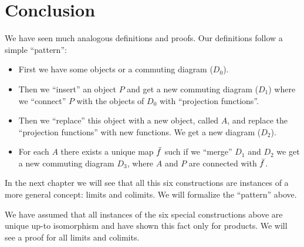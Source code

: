 \section*{Conclusion}
We have seen much analogous definitions and proofs.
Our definitions follow a simple ``pattern'':
\begin{itemize}
  \item First we have some objects or a commuting diagram ($D_0$).
  \item Then we ``insert'' an object $P$ and get a new commuting diagram ($D_1$) where we ``connect'' $P$ with the objects of $D_0$ with ``projection functions''.
  \item Then we ``replace'' this object with a new object, called $A$, and replace the ``projection functions'' with new functions. We get a new diagram ($D_2$).
  \item For each $A$ there exists a unique map $\bar{f}$ such if we ``merge'' $D_1$ and $D_2$ we get a new commuting diagram $D_3$, where $A$ and $P$ are connected with $\bar{f}$.
\end{itemize}

In the next chapter we will see that all this six constructions are instances of a more general concept: limits and colimits.
We will formalize the ``pattern'' above.

We have assumed that all instances of the six special constructions above are unique up-to isomorphism
and have shown this fact only for products. We will see a proof for all limits and colimits.



